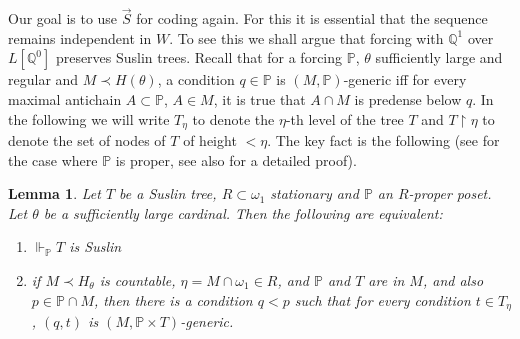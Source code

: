 \documentclass[a4paper,11pt]{article}
\newtheorem{lemma}[theorem]{Lemma}
\newcommand{\forceP}{\mathbb{P}}
\newcommand{\forceQ}{\mathbb{Q}}
\begin{document}
Our goal is to use $\vec{S}$ for coding again. For this it is essential that the sequence remains independent in $W$. To see this we shall argue that forcing with $\mathbb{Q}^1$ over $L[\forceQ^0]$ preserves Suslin trees. 
Recall that for a forcing $\forceP$, $\theta$ sufficiently large and regular and $M \prec H(\theta)$, a condition $q \in \forceP$ is $(M,\forceP)$-generic iff for every maximal antichain $A \subset \forceP$, $A \in M$, it is true that $ A \cap M$ is predense below $q$. In the following we will write $T_{\eta}$ to denote the $\eta$-th level of the tree $T$ and $T \upharpoonright \eta$ to denote the set of nodes of $T$ of height $< \eta$.
The key fact is the following (see \cite{Miyamoto2} for the case where $\forceP$ is proper, see also \cite{Ho1} for a detailed proof){.} 
\begin{lemma}\label{preservation of Suslin trees}
 Let $T$ be a Suslin tree, $R \subset \omega_1$ stationary and $\forceP$ an $R$-proper
 poset. Let $\theta$ be a sufficiently large cardinal.
 Then the following are equivalent:
 \begin{enumerate}
  \item $\Vdash_{\forceP} T$ is Suslin
 
  \item if $M \prec H_{\theta}$ is countable, $\eta = M \cap \omega_1 \in R$, and $\forceP$ and $T$ are in $M$,
  {and also} $p \in \forceP \cap M$, then there is a condition $q<p$ such that 
  for every condition $t \in T_{\eta}$, 
  $(q,t)$ is $(M, \forceP \times T)$-generic.
 \end{enumerate}

\end{lemma}
\end{document}
